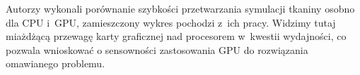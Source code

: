		
		Autorzy \cite{deformable} wykonali porównanie szybkości przetwarzania symulacji tkaniny osobno dla CPU i~GPU, zamieszczony wykres pochodzi z~ich pracy. Widzimy tutaj miażdżącą przewagę karty graficznej nad procesorem w~kwestii wydajności, co pozwala wnioskować o sensowności zastosowania GPU do rozwiązania omawianego problemu.
